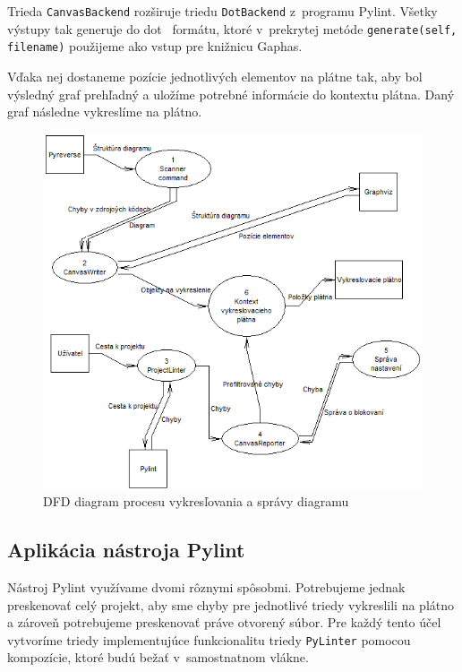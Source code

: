 \documentclass[11pt,oneside,final]{fithesis2}
\begin{document}
			Trieda \texttt{CanvasBackend} rozširuje triedu \texttt{DotBackend} z~programu Pylint. Všetky výstupy tak generuje do dot~\cite{dotformat} formátu, ktoré v~prekrytej metóde \texttt{generate(self, filename)} použijeme ako vstup pre knižnicu Gaphas. 
			
			Vďaka nej dostaneme pozície jednotlivých elementov na plátne tak, aby bol výsledný graf prehľadný a uložíme potrebné informácie do kontextu plátna. Daný graf následne vykreslíme na plátno.
	

	\begin{figure}[htb]
	 \centering
	 \includegraphics[width=\textwidth]{images/dfd_diagram}
	 \caption{DFD diagram procesu vykresľovania a správy diagramu}
	\end{figure}

	
		\subsection{Aplikácia nástroja Pylint}

		Nástroj Pylint využívame dvomi rôznymi spôsobmi. Potrebujeme jednak preskenovať celý projekt, aby sme chyby pre jednotlivé triedy vykreslili na plátno a zároveň potrebujeme preskenovať práve otvorený súbor. Pre každý tento účel vytvoríme triedy implementujúce funkcionalitu triedy \texttt{PyLinter} pomocou kompozície, ktoré budú bežať v~samostnatnom vlákne. 
		
\end{document}
